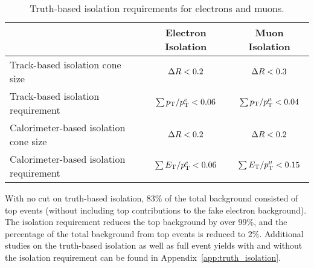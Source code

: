 \begin{table}[htp]
  \centering
  \begin{tabular}{l|c|c}
    ~       &   Electron Isolation & Muon Isolation \\
    \hline\hline
    Track-based isolation cone size   	    &   $\Delta R < 0.2$          & $\Delta R < 0.3$ \\
    Track-based isolation requirement       &   $\sum p_{\mathrm{T}}/p_{\mathrm{T}}^{e} <  0.06$ & $\sum p_{\mathrm{T}}/p_{\mathrm{T}}^{\mu} <  0.04$	\\
    Calorimeter-based isolation cone size   &   $\Delta R < 0.2$	         & $\Delta R < 0.2$\\
    Calorimeter-based isolation requirement &   $\sum E_{\mathrm{T}}/p_{\mathrm{T}}^{e} <  0.06$ & $\sum E_{\mathrm{T}}/p_{\mathrm{T}}^{\mu} <  0.15$	\\
    \hline
  \end{tabular}
  \caption{Truth-based isolation requirements for electrons and muons.} 
  \label{tab:truth_iso_definition}
\end{table}

With no cut on truth-based isolation, 83\% of the total background consisted of top events (without including top contributions to the fake electron background).
The isolation requirement reduces the top background by over 99\%, and the percentage of the total background from top events is reduced to 2\%.
Additional studies on the truth-based isolation as well as full event yields with and without the isolation requirement can be found in Appendix~\ref{app:truth_isolation}.
